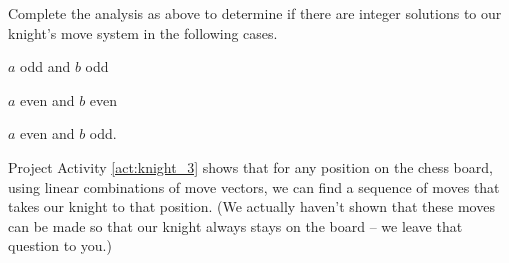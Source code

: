 \begin{pactivity} \label{act:knight_3} Complete the analysis as above to determine if there are integer solutions to our knight's move system in the following cases.
	\ba
	\item $a$ odd and $b$ odd
	\item $a$ even and $b$ even
	\item $a$ even and $b$ odd.
	\ea

\end{pactivity}

Project Activity \ref{act:knight_3} shows that for any position on the chess board, using linear combinations of move vectors, we can find a sequence of moves that takes our knight to that position. (We actually haven't shown that these moves can be made so that our knight always stays on the board -- we leave that question to you.)

